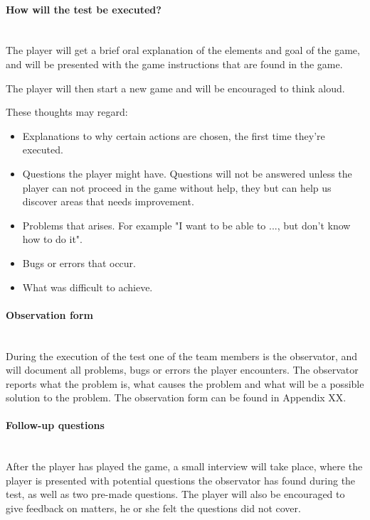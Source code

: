 \paragraph{How will the test be executed?}\mbox{}\\

The player will get a brief oral explanation of the elements and goal of the game, 
and will be presented with the game instructions that are found in the game.

The player will then start a new game and will be encouraged to think aloud. 

These thoughts may regard:

\begin{itemize}
  \item Explanations to why certain actions are chosen, the first time they're executed.
  \item Questions the player might have. Questions will not be answered unless the player can not proceed in the game without help, they but can help us discover areas that needs improvement.
  \item Problems that arises. For example "I want to be able to ..., but don't know how to do it". 
  \item Bugs or errors that occur.
  \item What was difficult to achieve.
\end{itemize}

\paragraph{Observation form}\mbox{}\\

During the execution of the test one of the team members is the observator, and will document all problems, bugs or errors the player encounters. The observator reports what the problem is, what causes the problem and what will be a possible solution to the problem. The observation form can be found in Appendix XX.

\paragraph{Follow-up questions}\mbox{}\\

After the player has played the game, a small interview will take place, where the player is presented with potential questions the observator has found during the test, as well as two pre-made questions. The player will also be encouraged to give feedback on matters, he or she felt the questions did not cover.

